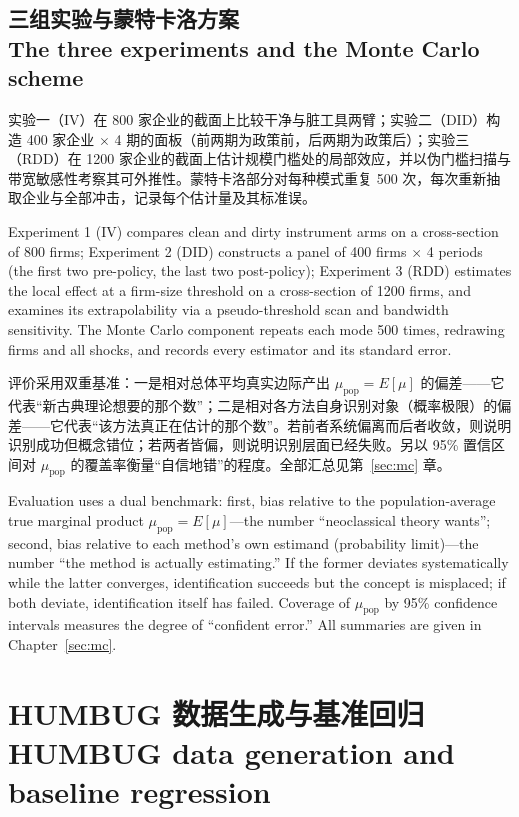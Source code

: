 \documentclass[12pt,a4paper]{ctexart}
\begin{document}
\subsection[三组实验与蒙特卡洛方案]{三组实验与蒙特卡洛方案\\[1pt]\normalsize The three experiments and the Monte Carlo scheme}

实验一（IV）在 800 家企业的截面上比较干净与脏工具两臂；实验二（DID）构造 400 家企业 $\times$ 4 期的面板（前两期为政策前，后两期为政策后）；实验三（RDD）在 1200 家企业的截面上估计规模门槛处的局部效应，并以伪门槛扫描与带宽敏感性考察其可外推性。蒙特卡洛部分对每种模式重复 500 次，每次重新抽取企业与全部冲击，记录每个估计量及其标准误。

Experiment 1 (IV) compares clean and dirty instrument arms on a cross-section of 800 firms; Experiment 2 (DID) constructs a panel of 400 firms $\times$ 4 periods (the first two pre-policy, the last two post-policy); Experiment 3 (RDD) estimates the local effect at a firm-size threshold on a cross-section of 1200 firms, and examines its extrapolability via a pseudo-threshold scan and bandwidth sensitivity. The Monte Carlo component repeats each mode 500 times, redrawing firms and all shocks, and records every estimator and its standard error.

评价采用双重基准：一是相对总体平均真实边际产出 $\mu_{\mathrm{pop}} = E[\mu]$ 的偏差——它代表“新古典理论想要的那个数”；二是相对各方法自身识别对象（概率极限）的偏差——它代表“该方法真正在估计的那个数”。若前者系统偏离而后者收敛，则说明识别成功但概念错位；若两者皆偏，则说明识别层面已经失败。另以 95\% 置信区间对 $\mu_{\mathrm{pop}}$ 的覆盖率衡量“自信地错”的程度。全部汇总见第~\ref{sec:mc} 章。

Evaluation uses a dual benchmark: first, bias relative to the population-average true marginal product $\mu_{\mathrm{pop}}=E[\mu]$—the number “neoclassical theory wants”; second, bias relative to each method's own estimand (probability limit)—the number “the method is actually estimating.” If the former deviates systematically while the latter converges, identification succeeds but the concept is misplaced; if both deviate, identification itself has failed. Coverage of $\mu_{\mathrm{pop}}$ by 95\% confidence intervals measures the degree of “confident error.” All summaries are given in Chapter~\ref{sec:mc}.

\section[HUMBUG 数据生成与基准回归]{HUMBUG 数据生成与基准回归\\[2pt]\normalsize HUMBUG data generation and baseline regression}
\end{document}
